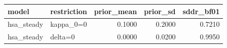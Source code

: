 \begin{tabular}{llrrr}
\toprule
model & restriction & prior\_mean & prior\_sd & sddr\_bf01 \\
\midrule
hsa\_steady & kappa\_0=0 & 0.1000 & 0.2000 & 0.7210 \\
hsa\_steady & delta=0 & 0.0000 & 0.0200 & 0.9950 \\
\bottomrule
\end{tabular}
